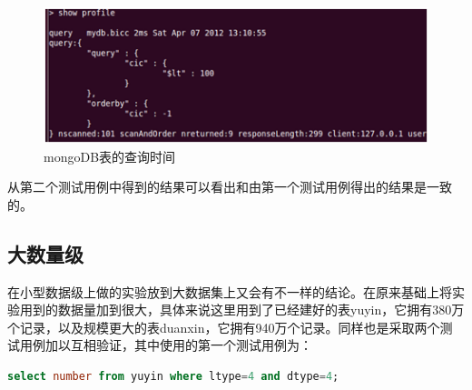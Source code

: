 \begin{description}
\item
\begin{figure}[!ht]
\centering
\includegraphics[]{photo/xjm4.png} 
\caption{mongoDB表的查询时间}
\end{figure} 

\end{description}
从第二个测试用例中得到的结果可以看出和由第一个测试用例得出的结果是一致的。

\subsection{大数量级}

  在小型数据级上做的实验放到大数据集上又会有不一样的结论。在原来基础上将实验用到的数据量加到很大，具体来说这里用到了已经建好的表yuyin，它拥有380万个记录，以及规模更大的表duanxin，它拥有940万个记录。同样也是采取两个测试用例加以互相验证，其中使用的第一个测试用例为：
\begin{lstlisting}[language=SQL]
select number from yuyin where ltype=4 and dtype=4;
\end{lstlisting}

